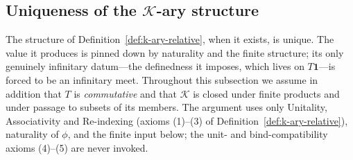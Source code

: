 %
%
%

\subsection{Uniqueness of the $\mathcal{K}$-ary structure}
\label{sec:k-ary-uniqueness}

The structure of Definition~\ref{def:k-ary-relative}, when it exists, is unique. The value it produces is pinned down by naturality and the finite structure; its only genuinely infinitary datum---the definedness it imposes, which lives on $T\mathbf 1$---is forced to be an infinitary meet. Throughout this subsection we assume in addition that $T$ is \emph{commutative} and that $\mathcal{K}$ is closed under finite products and under passage to subsets of its members. The argument uses only Unitality, Associativity and Re-indexing (axioms (1)--(3) of Definition~\ref{def:k-ary-relative}), naturality of $\phi$, and the finite input below; the unit- and bind-compatibility axioms (4)--(5) are never invoked.

